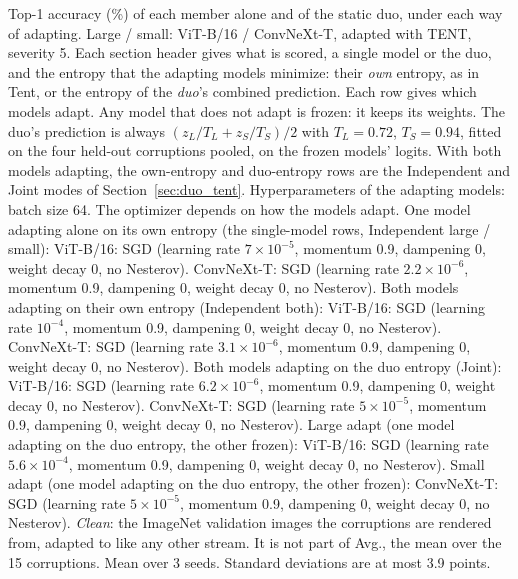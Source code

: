 \begin{table}[t]
    \centering
    \small
    \setlength{\tabcolsep}{3.5pt}
    \caption{Top-1 accuracy (\%) of each member alone and of the static duo, under each way of adapting. Large / small: ViT-B/16 / ConvNeXt-T, adapted with TENT, severity 5. Each section header gives what is scored, a single model or the duo, and the entropy that the adapting models minimize: their \emph{own} entropy, as in Tent, or the entropy of the \emph{duo}'s combined prediction. Each row gives which models adapt. Any model that does not adapt is frozen: it keeps its weights. The duo's prediction is always $(z_L / T_L + z_S / T_S) / 2$ with $T_L = 0.72$, $T_S = 0.94$, fitted on the four held-out corruptions pooled, on the frozen models' logits. With both models adapting, the own-entropy and duo-entropy rows are the Independent and Joint modes of Section~\ref{sec:duo_tent}. Hyperparameters of the adapting models: batch size 64. The optimizer depends on how the models adapt. One model adapting alone on its own entropy (the single-model rows, Independent large / small): ViT-B/16: SGD (learning rate $7 \times 10^{-5}$, momentum 0.9, dampening 0, weight decay 0, no Nesterov). ConvNeXt-T: SGD (learning rate $2.2 \times 10^{-6}$, momentum 0.9, dampening 0, weight decay 0, no Nesterov). Both models adapting on their own entropy (Independent both): ViT-B/16: SGD (learning rate $10^{-4}$, momentum 0.9, dampening 0, weight decay 0, no Nesterov). ConvNeXt-T: SGD (learning rate $3.1 \times 10^{-6}$, momentum 0.9, dampening 0, weight decay 0, no Nesterov). Both models adapting on the duo entropy (Joint): ViT-B/16: SGD (learning rate $6.2 \times 10^{-6}$, momentum 0.9, dampening 0, weight decay 0, no Nesterov). ConvNeXt-T: SGD (learning rate $5 \times 10^{-5}$, momentum 0.9, dampening 0, weight decay 0, no Nesterov). Large adapt (one model adapting on the duo entropy, the other frozen): ViT-B/16: SGD (learning rate $5.6 \times 10^{-4}$, momentum 0.9, dampening 0, weight decay 0, no Nesterov). Small adapt (one model adapting on the duo entropy, the other frozen): ConvNeXt-T: SGD (learning rate $5 \times 10^{-5}$, momentum 0.9, dampening 0, weight decay 0, no Nesterov). \emph{Clean}: the ImageNet validation images the corruptions are rendered from, adapted to like any other stream. It is not part of Avg., the mean over the 15 corruptions. Mean over 3 seeds. Standard deviations are at most 3.9 points.}

\end{table}
